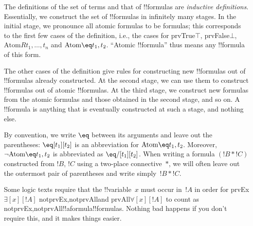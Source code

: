 \documentclass[10pt,a4paper]{article}
\theoremstyle{plain}
\theoremstyle{definition}
\theoremstyle{remark}
\newenvironment{explain}{}{}
\providecommand{\lforall}{\mathord{\forall}}
\providecommand{\lexists}{\mathord{\exists}}
\providecommand{\ltrue}{\top}
\providecommand{\lfalse}{\bot}
\providecommand{\iftag}[1]{#1}
\providecommand{\Atom}{\mathrm{Atom}}
\providecommand{\iftag}{}
\begin{document}
\begin{explain}
The definitions of the set of terms and that of !!{formula}s are
\emph{inductive definitions}.  Essentially, we construct the set of
!!{formula}s in infinitely many stages.  In the initial stage, we
pronounce all atomic formulas to be formulas; this corresponds to the
first few cases of the definition, i.e., the cases for
\iftag{prvTrue}{$\ltrue$, }{}%
\iftag{prvFalse}{$\lfalse$, }{}%
$\Atom{R}{t_1,\dots,t_n}$ and $\Atom{\eq}{t_1,t_2}$. ``Atomic
!!{formula}'' thus means any !!{formula} of this form.

The other cases of the definition give rules for constructing new
!!{formula}s out of !!{formula}s already constructed.  At the second
stage, we can use them to construct !!{formula}s out of atomic
!!{formula}s.  At the third stage, we construct new formulas from the
atomic formulas and those obtained in the second stage, and so on.  A
!!{formula} is anything that is eventually constructed at such a
stage, and nothing else.
\end{explain}

By convention, we write $\eq$ between its arguments and leave out the
parentheses: $\eq[t_1][t_2]$ is an abbreviation for
$\Atom{\eq}{t_1,t_2}$.  Moreover, $\lnot \Atom{\eq}{t_1,t_2}$ is
abbreviated as $\eq/[t_1][t_2]$. When writing a formula $(!B \ast !C)$
constructed from $!B$, $!C$ using a two-place connective~$\ast$, we
will often leave out the outermost pair of parentheses and write
simply~$!B \ast !C$.

\begin{intro}
Some logic texts require that the !!{variable}~$x$ must occur in~$!A$
in order for
\iftag{prvEx}{$\lexists[x][!A]$ }{}%
\iftag{notprvEx,notprvAll}{}{and }%
\iftag{prvAll}{$\lforall[x][!A]$ }{}%
to count as
\iftag{notprvEx,notprvAll}{!!a{formula}}{!!{formula}s}.
Nothing bad happens if you don't require this, and it makes things
easier.
\end{intro}
\end{document}
